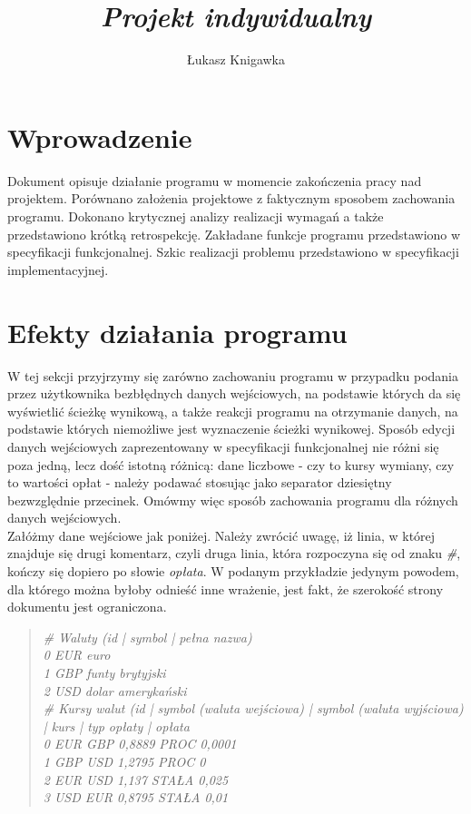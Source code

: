 \documentclass[a4paper,12pt]{article}
\title{ \sc{Sprawozdanie końcowe} \\
\emph{Projekt indywidualny} }
\author{Łukasz Knigawka}
\newcommand\tab[1][0.6cm]{\hspace*{#1}}
\begin{document}
\maketitle

\thispagestyle{empty}

\tableofcontents

\newpage

\section{Wprowadzenie}
\tab Dokument opisuje działanie programu w momencie zakończenia pracy nad projektem. Porównano założenia projektowe z faktycznym sposobem zachowania programu. Dokonano krytycznej analizy realizacji wymagań a także przedstawiono krótką retrospekcję. Zakładane funkcje programu przedstawiono w specyfikacji funkcjonalnej. Szkic realizacji problemu przedstawiono w specyfikacji implementacyjnej.

\section{Efekty działania programu}    

\tab W tej sekcji przyjrzymy się zarówno zachowaniu programu w przypadku podania przez użytkownika bezbłędnych danych wejściowych, na podstawie których da się wyświetlić ścieżkę wynikową, a także reakcji programu na otrzymanie danych, na podstawie których niemożliwe jest wyznaczenie ścieżki wynikowej. Sposób edycji danych wejściowych zaprezentowany w specyfikacji funkcjonalnej nie różni się poza jedną, lecz dość istotną różnicą: dane liczbowe - czy to kursy wymiany, czy to wartości opłat - należy podawać stosując jako separator dziesiętny bezwzględnie przecinek. Omówmy więc sposób zachowania programu dla różnych danych wejściowych.
\\\tab Załóżmy dane wejściowe jak poniżej. Należy zwrócić uwagę, iż linia, w której znajduje się drugi komentarz, czyli druga linia, która rozpoczyna się od znaku \textit{\#}, kończy się dopiero po słowie \textit{opłata}. W podanym przykładzie jedynym powodem, dla którego można byłoby odnieść inne wrażenie, jest fakt, że szerokość strony dokumentu jest ograniczona.
\begin{quote}
\textit{
\# Waluty (id | symbol | pełna nazwa)
\\0 EUR euro
\\1 GBP funty brytyjski
\\2 USD dolar amerykański
\\\# Kursy walut (id | symbol (waluta wejściowa) | symbol (waluta wyjściowa) | kurs | typ opłaty | opłata
\\0 EUR GBP 0,8889 PROC 0,0001
\\1 GBP USD 1,2795 PROC 0
\\2 EUR USD 1,137 STAŁA 0,025
\\3 USD EUR 0,8795 STAŁA 0,01
}
\end{quote}
\end{document}

